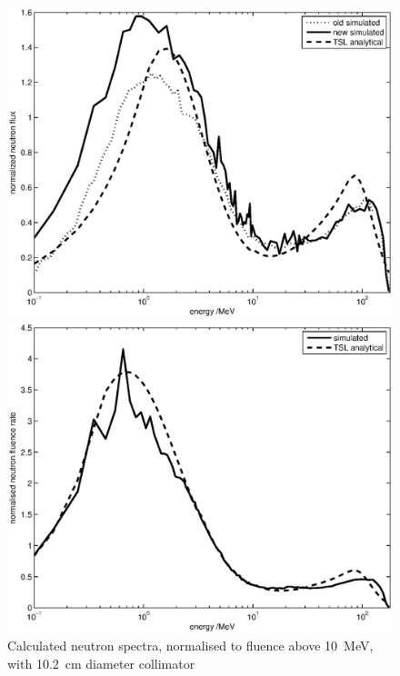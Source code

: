 \documentclass[11pt,a4paper]{IEEEtran}
\let\MYoriglatexcaption\caption
\renewcommand{\caption}[2][\relax]{\MYoriglatexcaption[#2]{#2}}
\begin{document}
\begin{figure}[t]
    \begin{minipage}{\columnwidth}
        \centering
        \includegraphics[width=0.9\columnwidth]{SUPNormalisedRADECS.eps}
    \end{minipage}
    \begin{minipage}{\columnwidth}
        \centering
        \includegraphics[width=0.9\columnwidth]{CUPcomparedProkofiev2014NormalisedRADECS.eps}
    \end{minipage}
	\caption{
        Calculated neutron spectra, normalised to fluence above \SI{10}{\MeV}, with
        \SI{10.2}{\cm} diameter collimator
    }
	\label{fig:Lethargyplots}
\end{figure}
\end{document}
